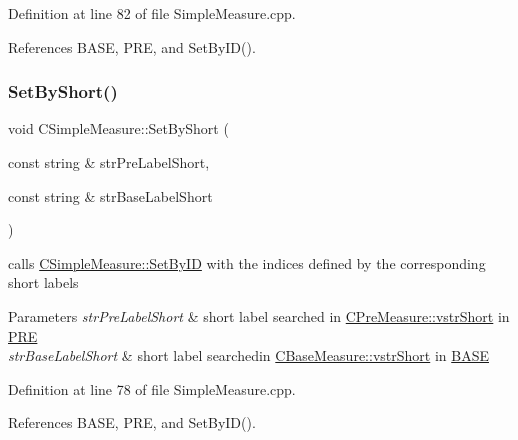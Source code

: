 Definition at line 82 of file Simple\+Measure.\+cpp.



References B\+A\+SE, P\+RE, and Set\+By\+I\+D().

\mbox{\label{classCSimpleMeasure_a36d8822c057c58669d23af68f24a75c5}} 
\subsubsection{\texorpdfstring{Set\+By\+Short()}{SetByShort()}}
{\footnotesize\ttfamily void C\+Simple\+Measure\+::\+Set\+By\+Short (\begin{DoxyParamCaption}\item[{const string \&}]{str\+Pre\+Label\+Short,  }\item[{const string \&}]{str\+Base\+Label\+Short }\end{DoxyParamCaption})}



calls \hyperlink{classCSimpleMeasure_a6945aa333dca5623482d38cd9a7e3225}{C\+Simple\+Measure\+::\+Set\+By\+ID} with the indices defined by the corresponding short labels 


\begin{DoxyParams}{Parameters}
{\em str\+Pre\+Label\+Short} & short label searched in \hyperlink{classCVectorHandle_afb50c8a33d4cf70bf92c644dca409ea2}{C\+Pre\+Measure\+::vstr\+Short} in \hyperlink{PreMeasure_8h_a349316092037fdd0773335fab4e15ee8}{P\+RE} \\
\hline
{\em str\+Base\+Label\+Short} & short label searchedin \hyperlink{classCVectorHandle_afb50c8a33d4cf70bf92c644dca409ea2}{C\+Base\+Measure\+::vstr\+Short} in \hyperlink{BaseMeasure_8h_a79bcfb6bde984f42d1124b068a509af7}{B\+A\+SE} \\
\hline
\end{DoxyParams}


Definition at line 78 of file Simple\+Measure.\+cpp.



References B\+A\+SE, P\+RE, and Set\+By\+I\+D().

\mbox{\label{classCSimpleMeasure_ab1e479ebf0d3a428ecd9f6b1daf3fe0c}} 
